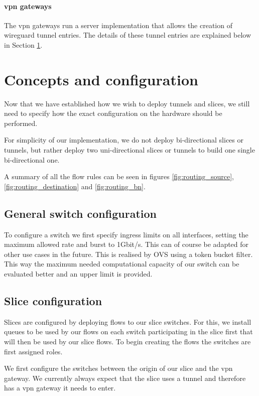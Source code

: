 \paragraph{\acrshort{vpn} gateways} The \acrshort{vpn} gateways run a server implementation that allows the creation of \gls{wireguard} \cite{wireguard} tunnel entries. The details of these tunnel entries are explained below in Section \ref{impl_concepts}.


\section{Concepts and configuration}
\label{impl_concepts}
Now that we have established how we wish to deploy tunnels and slices, we still need to specify how the exact configuration on the hardware should be performed.

For simplicity of our implementation, we do not deploy bi-directional slices or tunnels, but rather deploy two uni-directional slices or tunnels to build one single bi-directional one.

A summary of all the flow rules can be seen in figures \ref{fig:routing_source}, \ref{fig:routing_destination} and \ref{fig:routing_bn}.

\subsection{General switch configuration}
To configure a switch we first specify ingress limits on all interfaces, setting the maximum allowed rate and burst to 1Gbit/s. This can of course be adapted for other use cases in the future. This is realised by OVS using a token bucket filter. This way the maximum needed computational capacity of our switch can be evaluated better and an upper limit is provided.

\subsection{Slice configuration}
Slices are configured by deploying flows to our slice switches. For this, we install queues to be used by our flows on each switch participating in the slice first that will then be used by our slice flows. To begin creating the flows the switches are first assigned roles.

We first configure the switches between the origin of our slice and the \acrshort{vpn} gateway. We currently always expect that the slice uses a tunnel and therefore has a \acrshort{vpn} gateway it needs to enter.


